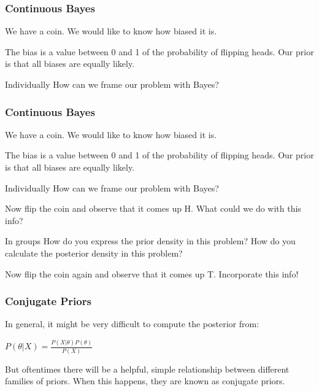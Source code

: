 \documentclass{beamer}
\begin{document}
\begin{frame}
  \frametitle{Continuous Bayes}
  We have a coin. We would like to know how biased it is. 



  The bias is a value between 0 and 1 of the probability of flipping heads. Our prior is that all biases are equally likely.


  \begin{block}{Individually}
    How can we frame our problem with Bayes?    
  \end{block}
\end{frame}

\begin{frame}
  \frametitle{Continuous Bayes}
  We have a coin. We would like to know how biased it is. 

  The bias is a value between 0 and 1 of the probability of flipping heads. Our prior is that all biases are equally likely.

  \begin{block}
    {Individually}
    How can we frame our problem with Bayes?
  \end{block}

  Now flip the coin and observe that it comes up H. What could we do with this info? \pause

  \begin{block}
    {In groups}
    How do you express the prior density in this problem?
    How do you calculate the posterior density in this problem?
  \end{block} \pause

  Now flip the coin again and observe that it comes up T. Incorporate this info!
\end{frame}

\begin{frame}
  \frametitle{Conjugate Priors}
  In general, it might be very difficult to compute the posterior from:



  \begin{math}
    P(\theta|X) = \frac{P(X|\theta)P(\theta)}{P(X)}
  \end{math}



  But oftentimes there will be a helpful, simple relationship between different families of priors. When this happens, they are known as conjugate priors.
\end{frame}
\end{document}

